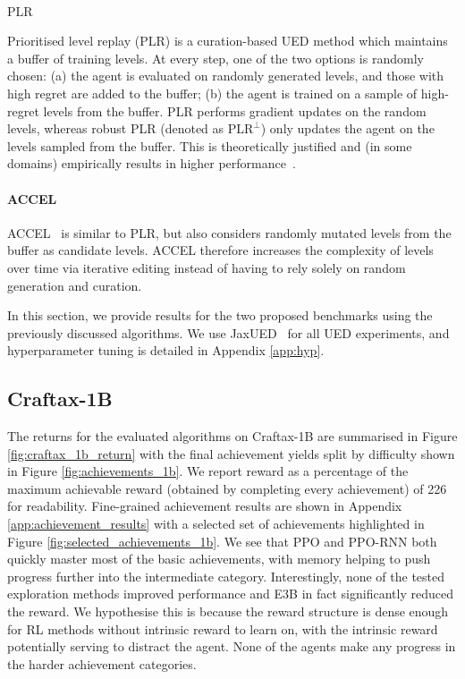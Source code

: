 \documentclass{article}
\theoremstyle{plain}
\theoremstyle{definition}
\theoremstyle{remark}
\begin{document}
\paragraph{$\text{PLR}$}
Prioritised level replay (PLR) \citep{jiang2021Replayguided,jiang2020Prioritized} is a curation-based UED method which maintains a buffer of training levels.
At every step, one of the two options is randomly chosen: (a) the agent is evaluated on randomly generated levels, and those with high regret are added to the buffer; (b) the agent is trained on a sample of high-regret levels from the buffer.
PLR performs gradient updates on the random levels, whereas robust PLR (denoted as $\text{PLR}^\perp$) only updates the agent on the levels sampled from the buffer. This is theoretically justified and (in some domains) empirically results in higher performance~\citep{jiang2021Replayguided}.

\paragraph{ACCEL}
ACCEL~\citep{holder2022Evolving} is similar to PLR, but also considers randomly mutated levels from the buffer as candidate levels.  ACCEL therefore increases the complexity of levels over time via iterative editing instead of having to rely solely on random generation and curation.

In this section, we provide results for the two proposed benchmarks using the previously discussed algorithms.  We use JaxUED~\citep{coward2024JaxUED} for all UED experiments, and hyperparameter tuning is detailed in Appendix \ref{app:hyp}.

\subsection{Craftax-1B} \label{sec:craftax_1b}

The returns for the evaluated algorithms on Craftax-1B are summarised in Figure \ref{fig:craftax_1b_return} with the final achievement yields split by difficulty shown in Figure \ref{fig:achievements_1b}.  We report reward as a percentage of the maximum achievable reward (obtained by completing every achievement) of 226 for readability.  Fine-grained achievement results are shown in Appendix \ref{app:achievement_results} with a selected set of achievements highlighted in Figure \ref{fig:selected_achievements_1b}.  We see that PPO and PPO-RNN both quickly master most of the basic achievements, with memory helping to push progress further into the intermediate category. Interestingly, none of the tested exploration methods improved performance and E3B in fact significantly reduced the reward.  We hypothesise this is because the reward structure is dense enough for RL methods without intrinsic reward to learn on, with the intrinsic reward potentially serving to distract the agent.  None of the agents make any progress in the harder achievement categories.
\end{document}
